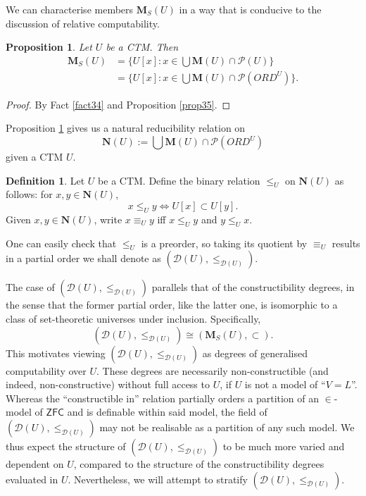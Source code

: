 \documentclass[12pt, twoside]{memoir}
\numberwithin{equation}{section}
\newtheorem{prop}[thm]{Proposition}
\theoremstyle{definition}
\newtheorem{defi}[thm]{Definition}
\theoremstyle{remark}
\theoremstyle{definition}
\theoremstyle{definition}
\theoremstyle{definition}
\theoremstyle{remark}
\begin{document}
We can characterise members $\mathbf{M}_{S}(U)$ in a way that is conducive to the discussion of relative computability.

\begin{prop}\label{prop37}
Let $U$ be a CTM. Then
\begin{align*}
    \mathbf{M}_{S}(U) & = \{U[x] : x \in \bigcup \mathbf{M}(U) \cap \mathcal{P}(U)\} \\
    & = \{U[x] : x \in \bigcup \mathbf{M}(U) \cap \mathcal{P}(ORD^U)\} \text{.}
\end{align*}
\end{prop}

\begin{proof}
By Fact \ref{fact34} and Proposition \ref{prop35}.
\end{proof}

Proposition \ref{prop37} gives us a natural reducibility relation on 
\begin{equation*}
    \mathbf{N}(U) := \bigcup \mathbf{M}(U) \cap \mathcal{P}(ORD^U)
\end{equation*}
given a CTM $U$. 

\begin{defi}\label{def9111}
Let $U$ be a CTM. Define the binary relation $\leq_U$ on $\mathbf{N}(U)$ as follows: for $x, y \in \mathbf{N}(U)$,
\begin{equation*}
    x \leq_U y \iff U[x] \subset U[y] \text{.}
\end{equation*}
Given $x, y \in \mathbf{N}(U)$, write $x \equiv_U y$ iff $x \leq_U y$ and $y \leq_U x$.
\end{defi}

One can easily check that $\leq_U$ is a preorder, so taking its quotient by $\equiv_U$ results in a partial order we shall denote as $(\mathcal{D}(U), \leq_{\mathcal{D}(U)})$.

The case of $(\mathcal{D}(U), \leq_{\mathcal{D}(U)})$ parallels that of the constructibility degrees, in the sense that the former partial order, like the latter one, is isomorphic to a class of set-theoretic universes under inclusion. Specifically, 
\begin{equation*}
   (\mathcal{D}(U), \leq_{\mathcal{D}(U)}) \cong (\mathbf{M}_S(U), \subset) \text{.} 
\end{equation*} 
This motivates viewing $(\mathcal{D}(U), \leq_{\mathcal{D}(U)})$ as degrees of generalised computability over $U$. These degrees are necessarily non-constructible (and indeed, non-constructive) without full access to $U$, if $U$ is not a model of ``$V = L$''. Whereas the ``constructible in'' relation partially orders a partition of an $\in$-model of $\mathsf{ZFC}$ and is definable within said model, the field of $(\mathcal{D}(U), \leq_{\mathcal{D}(U)})$ may not be realisable as a partition of any such model. We thus expect the structure of $(\mathcal{D}(U), \leq_{\mathcal{D}(U)})$ to be much more varied and dependent on $U$, compared to the structure of the constructibility degrees evaluated in $U$. Nevertheless, we will attempt to stratify $(\mathcal{D}(U), \leq_{\mathcal{D}(U)})$.
\end{document}
